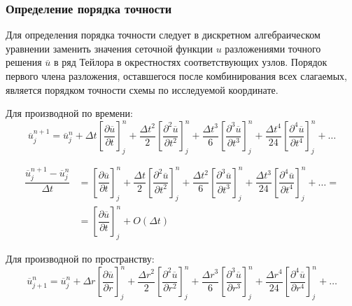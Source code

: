 \subsubsection{Определение порядка точности}

Для определения порядка точности следует в дискретном алгебраическом уравнении заменить значения сеточной функции $u$ разложениями точного решения $\overline{u}$ в ряд Тейлора в окрестностях соответствующих узлов. Порядок первого члена разложения, оставшегося после комбинирования всех слагаемых, является порядком точности схемы по исследуемой координате.

Для производной по времени:
\begin{equation*}
	\overline{u}_j^{n+1} = \overline{u}_j^n + \Delta t \left[ \dfrac{\partial \overline{u}}{\partial t} \right]_j^n + \dfrac{\Delta t^2}{2} \left[ \dfrac{\partial^2 \overline{u}}{\partial t^2} \right]_j^n +
	\dfrac{\Delta t^3}{6} \left[ \dfrac{\partial^3 \overline{u}}{\partial t^3} \right]_j^n +
	\dfrac{\Delta t^4}{24} \left[ \dfrac{\partial^4 \overline{u}}{\partial t^4} \right]_j^n + \dots
\end{equation*}

\begin{equation} \label{ftcs_accurancy_time}
\begin{split}
	\dfrac{\overline{u}_j^{n+1} - \overline{u}_j^n}{\Delta t} &=
	\left[ \dfrac{\partial \overline{u}}{\partial t} \right]_j^n + \dfrac{\Delta t}{2} \left[ \dfrac{\partial^2 \overline{u}}{\partial t^2} \right]_j^n +
	\dfrac{\Delta t^2}{6} \left[ \dfrac{\partial^3 \overline{u}}{\partial t^3} \right]_j^n +
	\dfrac{\Delta t^3}{24} \left[ \dfrac{\partial^4 \overline{u}}{\partial t^4} \right]_j^n + \dots = \\
	&= 
	\left[ \dfrac{\partial \overline{u}}{\partial t} \right]_j^n + O(\Delta t)
\end{split}
\end{equation}

Для производной по пространству:
\begin{equation*}
	\overline{u}_{j+1}^n = \overline{u}_j^n + \Delta r \left[ \dfrac{\partial \overline{u}}{\partial r} \right]_j^n + \dfrac{\Delta r^2}{2} \left[ \dfrac{\partial^2 \overline{u}}{\partial r^2} \right]_j^n +
	\dfrac{\Delta r^3}{6} \left[ \dfrac{\partial^3 \overline{u}}{\partial r^3} \right]_j^n +
	\dfrac{\Delta r^4}{24} \left[ \dfrac{\partial^4 \overline{u}}{\partial r^4} \right]_j^n + \dots
\end{equation*}

